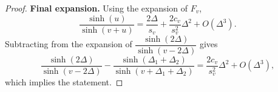 \documentclass[10pt,a4paper]{amsart}
\begin{document}
\begin{proof}
	\medskip
	\noindent\textbf{Final expansion.}
	Using the expansion of $F_v$,
	\[
	\frac{\sinh(u)}{\sinh(v+u)}
	= \frac{2\Delta}{s_v}+\frac{2c_v}{s_v^2}\Delta^2 + O(\Delta^3).
	\]
	Subtracting from the expansion of 
	\(\dfrac{\sinh(2\Delta)}{\sinh(v-2\Delta)}\) gives
	\[
	\frac{\sinh(2\Delta)}{\sinh(v-2\Delta)}
	-
	\frac{\sinh(\Delta_1+\Delta_2)}{\sinh(v+\Delta_1+\Delta_2)}
	= \frac{2c_v}{s_v^2}\Delta^2 + O(\Delta^3),
	\]
	which implies the statement.
\end{proof}
\end{document}
